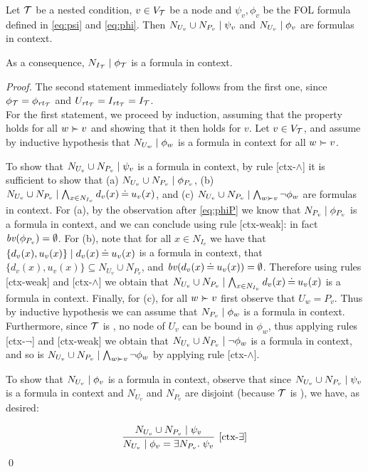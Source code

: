 \begin{proposition}
	\label{prop:formula in context}
	Let ${\mathcal{T}}$ be a {\proper} nested condition, $v \in V_{\mathcal{T}}$ be a node and $\psi_v, \phi_v$ be the FOL formula defined in \eqref{eq:psi} and \eqref{eq:phi}. Then ${N_{U_v}\cup N_{P_v}} \mid {\psi_v}$ and ${N_{U_v}} \mid {\phi_v}$ are formulas in context. 
 
	As a consequence, 	 ${N_{I_{\mathcal{T}}}} \mid {\phi_{\mathcal{T}}}$ is a formula in context. 
\end{proposition}
\begin{proof}
	The second statement immediately follows from the first one, since  $\phi_{\mathcal{T}} = \phi_{\mathit{rt}_{{\mathcal{T}}}}$ and $U_{\mathit{rt}_{{\mathcal{T}}}} = I_{\mathit{rt}_{{\mathcal{T}}}} = I_{\mathcal{T}}$.\\
%
For the first statement, we proceed by induction, assuming that the property holds for all $w\childof v$ and showing that it then holds for $v$.
	Let $v\in V_{\mathcal{T}}$, and assume by inductive hypothesis that ${N_{U_w}} \mid {\phi_w}$ is a formula in context for all $w\childof v$. 
	
	To show that ${N_{U_v} \cup N_{P_v}} \mid {\psi_v}$ is a formula in context, by rule [ctx-$\wedge$] it is sufficient to show that 
	(a) ${N_{U_v} \cup N_{P_v}} \mid {\phi_{P_v}}$, (b) ${N_{U_v} \cup N_{P_v}} \mid {\bigwedge_{x\in N_{I_v}} d_v(x)\mathbin{\doteq}u_v(x)}$, and (c) $\ctx{N_{U_v} \cup N_{P_v}}{\bigwedge_{w\childof v} \neg\phi_w}$ are formulas in context. For (a), by the observation after \eqref{eq:phiP} we know that ${N_{P_v}} \mid {\phi_{P_v}}$ is a formula in context, and we can conclude using rule [ctx-weak]: in fact $\mathit{bv}(\phi_{P_v}) = \emptyset$.
	For (b), note that for all $x \in N_{I_v}$ we have that ${\{d_v(x),u_v(x)\}} \mid {d_v(x)\mathbin{\doteq}u_v(x)}$ is a formula in context, that $\{d_v(x),u_v(x)\} \subseteq N_{U_v} \cup N_{P_v}$, and $\mathit{bv}(d_v(x)\mathbin{\doteq} u_v(x))= \emptyset$. Therefore using rules [ctx-weak] and [ctx-$\wedge$] we obtain that ${N_{U_v} \cup N_{P_v}} \mid {\bigwedge_{x\in N_{I_v}} d_v(x)\mathbin{\doteq}u_v(x)}$ is a formula in context. Finally, for (c), for all $w\childof v$ first observe that $U_w = P_v$. Thus by inductive hypothesis we can assume that ${N_{P_v}} \mid {\phi_w}$ is a formula in context. Furthermore,  since ${\mathcal{T}}$ is {\proper}, no node of $U_v$ can be bound in $\phi_w$, thus applying rules [ctx-$\neg$] and [ctx-weak] we obtain that ${N_{U_v} \cup N_{P_v}} \mid {\neg\phi_w}$ is a formula in context, and so is 
	$\ctx{N_{U_v} \cup N_{P_v}}{\bigwedge_{w\childof v} \neg\phi_w}$ by applying rule [ctx-$\wedge$].

	To show that ${N_{U_v}} \mid {\phi_v}$ is a formula in context, observe that since ${N_{U_v} \cup N_{P_v}} \mid {\psi_v}$ is a formula in context and $N_{U_v}$ and $N_{P_v}$ are disjoint (because ${\mathcal{T}}$ is {\proper}), we have, as desired:

	$$\infer[{[\mbox{ctx-}\exists]}]
	{\ctx{N_{U_v}}{\phi_v = \exists N_{P_v}\st \psi_v}}
	{\ctx{N_{U_v} \cup N_{P_v}}{\psi_v}}$$
	\qed	
\end{proof}

